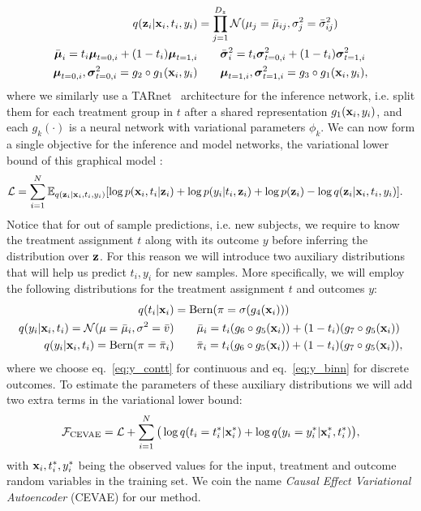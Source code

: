\begin{align}
q(\mathbf{z}_i|\mathbf{x}_i, t_i, y_i) & = \prod_{j=1}^{D_z}\mathcal{N}(\mu_j=\bar{\mu}_{ij}, \sigma^2_j = \bar{\sigma}_{ij}^2)\\
\bar{\boldsymbol{\mu}}_{i} = t_i \boldsymbol{\mu}_{t=0, i} + (1 - t_i)\boldsymbol{\mu}_{t=1, i}&\qquad
\bar{\boldsymbol{\sigma}}^2_i = t_i \boldsymbol{\sigma}^2_{t=0, i} + (1 - t_i)\boldsymbol{\sigma}^2_{t=1, i}\nonumber\\
\boldsymbol{\mu}_{t=0, i},\boldsymbol{\sigma}^2_{t=0, i} = g_2\circ g_1(\mathbf{x}_i, y_i) &\qquad
\boldsymbol{\mu}_{t=1,i},\boldsymbol{\sigma}^2_{t=1,i} = g_3 \circ g_1(\mathbf{x}_i, y_i),\nonumber
\end{align}
where we similarly use a TARnet~\citep{shalit2016estimating} architecture for the inference network, i.e. split them for each treatment group in $t$ after a shared representation $g_1(\mathbf{x}_i, y_i)$, and each $g_k(\cdot)$ is a neural network with variational parameters $\phi_k$. 
We can now form a single objective for the inference and model networks, the variational lower bound of this graphical model \citep{kingma2013auto,rezende2014stochastic}:
\begin{align}
\mathcal{L} & = \sum_{i=1}^{N}\mathbb{E}_{q(\mathbf{z}_i|\mathbf{x}_i,t_i,y_i)}[\log p(\mathbf{x}_i, t_i|\mathbf{z}_i) + \log p(y_i|t_i, \mathbf{z}_i) + \log p(\mathbf{z}_i) - \log q(\mathbf{z}_i|\mathbf{x}_i,t_i,y_i)]. \label{eq:lb_full}
\end{align}
Notice that for out of sample predictions, i.e. new subjects, we require to know the treatment assignment $t$ along with its outcome $y$ before inferring the distribution over $\mathbf{z}$. For this reason we will introduce two auxiliary distributions that will help us predict $t_i,y_i$ for new samples. More specifically, we will employ the following distributions for the treatment assignment $t$ and outcomes $y$: 
\begin{align}
q(t_i | \mathbf{x}_i) &= \text{Bern}(\pi = \sigma(g_4(\mathbf{x}_i)))\\
q(y_i|\mathbf{x}_i,t_i) = \mathcal{N}(\mu=\bar{\mu}_i, \sigma^2=\bar{v}) & \qquad \bar{\mu}_i = t_i (g_6 \circ g_5(\mathbf{x}_i)) + (1 - t_i)(g_7 \circ g_5(\mathbf{x}_i))\label{eq:y_contt}\\
q(y_i|\mathbf{x}_i,t_i) = \text{Bern}(\pi=\bar{\pi}_i) & \qquad\bar{\pi}_i = t_i (g_6\circ g_5(\mathbf{x}_i)) + (1 - t_i)(g_7 \circ g_5(\mathbf{x}_i)),\label{eq:y_binn}
\end{align}
where we choose eq.~\ref{eq:y_contt} for continuous and eq.~\ref{eq:y_binn} for discrete outcomes. To estimate the parameters of these auxiliary distributions we will add two extra terms in the variational lower bound:
\begin{align}
\mathcal{F}_{\text{CEVAE}} = \mathcal{L} + \sum_{i=1}^{N}\big(\log q(t_i = t^*_i|\mathbf{x}^*_i) + \log q(y_i=y^*_i|\mathbf{x}^*_i, t^*_i)\big),\label{eq:objfn}
\end{align}
with $\mathbf{x}_i,t^*_i,y^*_i$ being the observed values for the input, treatment and outcome random variables in the training set. We coin the name \emph{Causal Effect Variational Autoencoder} (CEVAE) for our method.